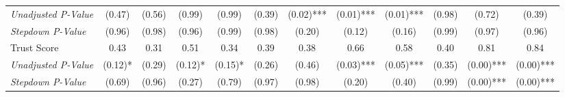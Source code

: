 \begin{tabular}{l c c c c c c c c c c c}
\quad \textit{Unadjusted P-Value} & (0.47) & (0.56) & (0.99) & (0.99) & (0.39) & (0.02)*** & (0.01)*** & (0.01)*** & (0.98) & (0.72) & (0.39) \\
\quad \textit{Stepdown P-Value} & (0.96) & (0.98) & (0.96) & (0.99) & (0.98) & (0.20) & (0.12) & (0.16) & (0.99) & (0.97) & (0.96) \\
Trust Score & 0.43 & 0.31 & 0.51 & 0.34 & 0.39 & 0.38 & 0.66 & 0.58 & 0.40 & 0.81 & 0.84 \\
\quad \textit{Unadjusted P-Value} & (0.12)* & (0.29) & (0.12)* & (0.15)* & (0.26) & (0.46) & (0.03)*** & (0.05)*** & (0.35) & (0.00)*** & (0.00)*** \\
\quad \textit{Stepdown P-Value} & (0.69) & (0.96) & (0.27) & (0.79) & (0.97) & (0.98) & (0.20) & (0.40) & (0.99) & (0.00)*** & (0.00)*** \\
\bottomrule
\end{tabular}

